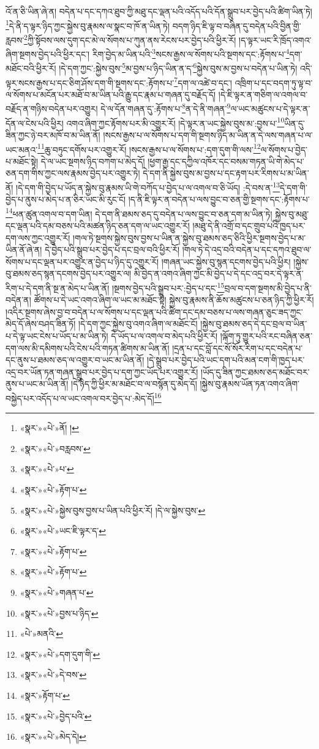 འོ་ན་ཅི་ཡིན་ཞེ་ན། བདེན་པ་དང་དཀའ་ཐུབ་ཀྱི་མཐུ་དང་ལྡན་པའི་འདོད་པའི་དོན་སྒྲུབ་པར་བྱེད་པའི་ཚིག་ཡིན་ཏེ། \footnote{«སྣར་»«པེ་»ནོ། ། }དེ་ནི་ད་ལྟར་ཉིད་ཀྱང་སྐྱེས་བུ་རྣམས་ལ་སྣང་བ་ཁོ་ན་ཡིན་ཏེ། བདག་ཉིད་ཇི་ལྟ་བ་བཞིན་དུ་བདེན་པའི་བྱིན་གྱི་རླབས་\footnote{«སྣར་»«པེ་»བརླབས་}ཀྱི་སྟོབས་ལས་དུག་དང་མེ་ལ་སོགས་པ་ཀུན་ནས་རེངས་པར་བྱེད་པའི་ཕྱིར་རོ། །ད་ལྟར་ཡང་རི་ཁྲོད་འགའ་ཞིག་སྔགས་བྱེད་པའི་ཕྱིར་དང་། རིག་བྱེད་མ་ཡིན་པའི་\footnote{«སྣར་»«པེ་»པ་}སངས་རྒྱས་ལ་སོགས་པའི་སྔགས་དང་:རྟོགས་པ་\footnote{«སྣར་»«པེ་»རྟོག་པ་}དག་མཐོང་བའི་ཕྱིར་རོ། །དེ་དག་ཀྱང་:སྐྱེས་བུས་\footnote{«སྣར་»«པེ་»སྐྱེས་བུས་བྱས་པ་ཡིན་པའི་ཕྱིར་རོ། །དེ་ལ་སྐྱེས་བུས་}མ་བྱས་པ་ཉིད་ཡིན་ན་ད་\footnote{«སྣར་»«པེ་»ཡང་ཇི་ལྟར་ད་}སྐྱེས་བུས་མ་བྱས་པ་བདེན་པ་ཡིན་ཏེ། འདི་ལྟར་སངས་རྒྱས་པ་དང་ཅིག་ཤོས་དག་གི་སྔགས་དང་:རྟོགས་པ་\footnote{«སྣར་»«པེ་»རྟོག་པ་}དག་ལ་འཚེ་བ་དང་། འཁྲིག་པ་དང་བདག་ཏུ་ལྟ་བ་ལ་སོགས་པ་མངོན་པར་མཐོ་བ་མ་ཡིན་པའི་རྒྱུ་དང་རྣམ་པ་གཞན་དུ་བརྗོད་དོ། །དེ་ཇི་ལྟར་ན་གཅིག་ལ་འགལ་བ་བརྗོད་ན་གཉིས་བདེན་པར་འགྱུར། དེ་ལ་དོན་གཞན་དུ་:རྟོགས་པ་\footnote{«སྣར་»«པེ་»རྟོག་པ་}ན་དེ་ནི་གཞན་\footnote{«སྣར་»«པེ་»གཞན་པ་}ལ་ཡང་མཚུངས་པ་དེ་ལྟར་ན་དོན་ལ་ངེས་པའི་ཕྱིར། འགའ་ཞིག་ཀྱང་རྟོགས་པར་མི་འགྱུར་རོ། །དེ་ལྟར་ན་ཡང་སྐྱེས་བུས་མ་:བྱས་པ་\footnote{«སྣར་»«པེ་»བྱས་པ་ཉིད་}ཡིན་དུ་ཟིན་ཀྱང་ཉེ་བར་མཁོ་བ་མ་ཡིན་ནོ། །སངས་རྒྱས་པ་ལ་སོགས་པ་དག་གི་སྔགས་ཉིད་མ་ཡིན་ན་དེ་ལས་གཞན་པ་ལ་ཡང་མནའ་\footnote{«པེ་»མནའི་}ཆུ་བཏུང་དགོས་པར་འགྱུར་རོ། །སངས་རྒྱས་པ་ལ་སོགས་པ་:དག་དུག་གི་ལས་\footnote{«སྣར་»«པེ་»དག་དུག་གི་}ལ་སོགས་པ་བྱེད་པ་མཐོང་སྟེ། དེ་ལ་ཡང་སྔགས་ཉིད་བཀག་པ་མེད་དོ། །ཕྱག་རྒྱ་དང་དཀྱིལ་འཁོར་དང་བསམ་གཏན་ཡི་གེ་མེད་པ་ཅན་དག་གིས་ཀྱང་ལས་རྣམས་བྱེད་པར་འགྱུར་ཏེ། དེ་དག་ནི་སྐྱེས་བུས་མ་བྱས་པ་དང་རྟག་པར་རིགས་པ་མ་ཡིན་ནོ། །དེ་དག་གི་བྱེད་པ་ཡོད་ན་སྐྱེས་བུ་རྣམས་ཡི་གེ་བཀོད་པ་བྱེད་པ་ལ་འགལ་བ་ཅི་ཡོད། :དེ་བས་ན་\footnote{«སྣར་»«པེ་»དེ་བས་}དེ་དག་གི་བྱེད་པ་ནུས་པ་མེད་པ་ན་ཅིར་ཡང་མི་རུང་ངོ། །ད་ནི་ཇི་ལྟར་ན་བདེན་པ་ལས་བྱུང་བ་ཅན་གྱི་སྔགས་དང་:རྟོགས་པ་\footnote{«སྣར་»རྟོག་པ་}ཕན་ཚུན་འགལ་བ་དག་ཡིན། དེ་དག་ནི་ཐམས་ཅད་དུ་བདེན་པ་ལས་བྱུང་བ་ཅན་དག་མ་ཡིན་ཏེ། སྐྱེས་བུ་མཐུ་དང་ལྡན་པའི་དམ་བཅས་པའི་མཚན་ཉིད་ཅན་དག་ལ་ཡང་འགྱུར་རོ། །མཐུ་དེ་ནི་འགྲོ་བ་དང་གྲུབ་པའི་ཁྱད་པར་དག་ལས་ཀྱང་འགྱུར་རོ། །གལ་ཏེ་སྔགས་སྐྱེས་བུས་བྱས་པ་ཡིན་ན་སྐྱེས་བུ་ཐམས་ཅད་ཅིའི་ཕྱིར་སྔགས་བྱེད་པ་མ་ཡིན་ནོ་ཞེ་ན། དེ་བྱེད་པའི་སྒྲུབ་པར་བྱེད་པ་དང་བྲལ་བའི་ཕྱིར་རོ། །གལ་ཏེ་དེ་འདྲ་བའི་བདེན་པ་དང་དཀའ་ཐུབ་ལ་སོགས་པ་དང་ལྡན་པར་འགྱུར་ན་བྱེད་པ་ཉིད་དུ་འགྱུར་རོ། །གཞན་ཡང་སྐྱེས་བུ་སྙན་དངགས་བྱེད་པའི་ཕྱིར། །སྐྱེས་བུ་ཐམས་ཅད་སྙན་དངགས་བྱེད་པར་འགྱུར་ལ། མི་བྱེད་ན་འགའ་ཞིག་ཀྱང་མི་བྱེད་པ་དེ་དང་འདྲ་བར་དེ་ལྟར་ན་རིག་པ་དེ་དག་ནི་སྔ་ན་མེད་པ་ཡིན་ནོ། །སྔགས་བྱེད་པའི་སྒྲུབ་པར་:བྱེད་པ་དང་\footnote{«སྣར་»«པེ་»བྱེད་པའི་}བྲལ་བ་དག་སྔགས་མི་བྱེད་པ་ནི་བདེན་ན། ཚོགས་པ་དེ་ཡང་འགའ་ཞིག་ལ་ཡང་མ་མཐོང་སྟེ། སྐྱེས་བུ་རྣམས་ནི་ཆོས་མཚུངས་པ་ཅན་ཉིད་ཀྱི་ཕྱིར་རོ། །འདིར་སྔགས་ཞེས་བྱ་བ་བདེན་པ་ལ་སོགས་པ་དང་ལྡན་པའི་ཚིག་དང་དམ་བཅས་པ་ལས་གཞན་ཅུང་ཟད་ཀྱང་མེད་དོ་ཞེས་བཤད་ཟིན་ཏོ། །དེ་དག་ཀྱང་སྐྱེས་བུ་འགའ་ཞིག་ལ་མཐོང་ངོ། །སྐྱེས་བུ་ཐམས་ཅད་དེ་དང་བྲལ་བ་ཡིན་པ་དེ་ལྟ་ཡང་ངེས་པ་ཡོད་པ་མ་ཡིན་ཏེ། དེ་ཡོད་པ་ལ་འགལ་བ་མེད་པའི་ཕྱིར་རོ། །ལྐོག་ཏུ་གྱུར་པའི་རང་བཞིན་ཅན་དག་ལས་མི་དམིགས་པའི་ངེས་པའི་གཏན་ཚིགས་མ་ཡིན་ནོ། །དྲན་པ་དང་བློ་དང་སོ་སོར་རིག་པ་དང་བདེན་པ་དང་ནུས་པ་ཐམས་ཅད་ལ་འགྱུར་བ་ཡང་མ་ཡིན་ནོ། །དེ་སྒྲུབ་པར་བྱེད་པའི་ཡང་དག་པའི་མན་ངག་གི་ཁྱད་པར་འདྲ་བར་ཡོན་ཏན་གཞན་སྒྲུབ་པར་བྱེད་པ་དག་ཀྱང་ཡོད་པར་འགྱུར་རོ། །ཡོད་དུ་ཟིན་ཀྱང་ཐམས་ཅད་མཐོང་བར་ནུས་པ་ཡང་མ་ཡིན་ནོ། །དེ་ཉིད་ཀྱི་ཕྱིར་མ་མཐོང་བ་ལ་བསྙོན་དུ་མེད་དོ། །སྐྱེས་བུ་རྣམས་ཡོན་ཏན་འགའ་ཞིག་བསྐྱེད་པར་འདོད་པ་ལ་ཡང་འགལ་བར་བྱེད་པ་:མེད་དོ།\footnote{«སྣར་»«པེ་»མེད་དེ།} 
